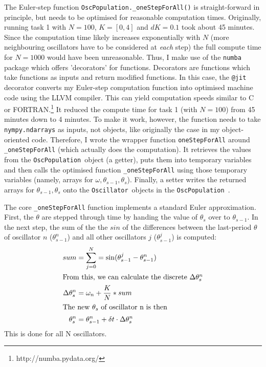 \documentclass[11pt,a4paper]{article}
\newcommand{\graph}{\medskip\noindent}
\newcommand{\osc}{\texttt{Oscillator}~}
\newcommand{\oscpop}{\texttt{OscPopulation}~}
\newcommand{\code}[1]{\texttt{#1}}
\begin{document}
\graph
The Euler-step function \code{OscPopulation.\_oneStepForAll()} is straight-forward in principle, but needs to be optimised for reasonable computation times. 
Originally, running task 1 with $ N = 100$, $K = [0, 4]$ and $dK = 0.1$ took about 45 minutes. 
Since the computation time likely increases exponentially with $N$ (more neighbouring oscillators have to be considered at \textit{each} step) the full compute time for $N=1000$ would have been unreasonable. 
Thus, I make use of the \code{numba} package which offers 'decorators' for functions. 
Decorators are functions which take functions as inputs and return modified functions.
In this case, the \code{@jit} decorator converts my Euler-step computation function into optimised machine code using the LLVM compiler. 
This can yield computation speeds similar to C or FORTRAN.\footnote{http://numba.pydata.org/}
It reduced the compute time for task 1 (with $N = 100$) from 45 minutes down to 4 minutes. 
%
To make it work, however, the function needs to take \code{nympy.ndarrays} as inputs, not objects, like originally the case in my object-oriented code. 
Therefore, I wrote the wrapper function \code{oneStepForAll} around \code{\_oneStepForAll} (which actually does the computation). 
It retrieves the values from the \oscpop object (a getter), puts them into temporary variables and then calls the optimised function \code{\_oneStepForAll} using those temporary variables (namely, arrays for $\omega, \theta_{s-1}, \theta_{s}$).
Finally, a setter writes the returned arrays for $\theta_{s-1}, \theta_{s}$ onto the \osc objects in the \oscpop. 

The core \code{\_oneStepForAll} function implements a standard Euler approximation.
First, the $\theta$ are stepped through time by handing the value of $\theta_{s}$ over to $\theta_{s-1}$.
In the next step, the sum of the the $sin$ of the differences between the last-period $\theta$ of oscillator $n$ ($\theta_{s-1}^n$) and all other oscillators $j$ ($\theta_{s-1}^j$) is computed:
\begin{align*}
	sum 					& = \sum_{j = 0}^N = \sin(\theta^j_{s-1} - \theta^n_{s-1}) \\
\intertext{From this, we can calculate the discrete $\Delta\theta_s^n$}
	\Delta\theta_s^n 		& = \omega_n + \frac{K}{N} *  sum \\
\intertext{The new $\theta_s$ of oscillator n is then}
	\theta^n_s 				& = \theta^n_{s-1} + \delta t \cdot \Delta\theta_s^n \\
\end{align*}
This is done for all N oscillators. 
\end{document}
